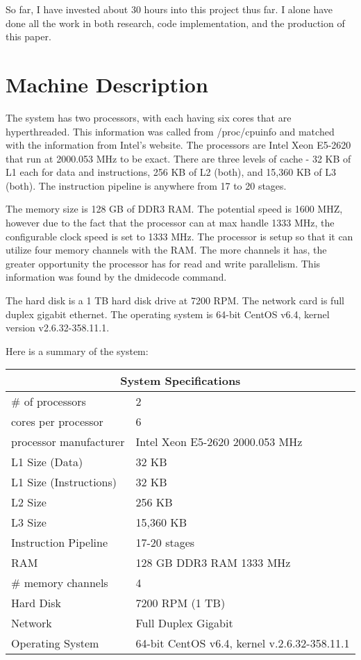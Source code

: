 \documentclass[paper=a4, fontsize=11pt]{scrartcl}
\numberwithin{equation}{section}        %
\numberwithin{figure}{section}          %
\numberwithin{table}{section}               %
\begin{document}
So far, I have invested about 30 hours into this project thus far.  I alone have done all the work in both research, code implementation, and the production of this paper.

\section{Machine Description}

The system has two processors, with each having six cores that are hyperthreaded.  This information was called from /proc/cpuinfo and matched with the information from Intel's website.  The processors are Intel Xeon E5-2620 that run at 2000.053 MHz to be exact.  There are three levels of cache - 32 KB of L1 each for data and instructions, 256 KB of L2 (both), and 15,360 KB of L3 (both).  The instruction pipeline is anywhere from 17 to 20 stages.

The memory size is 128 GB of DDR3 RAM.  The potential speed is 1600 MHZ, however due to the fact that the processor can at max handle 1333 MHz, the configurable clock speed is set to 1333 MHz.  The processor is setup so that it can utilize four memory channels with the RAM.  The more channels it has, the greater opportunity the processor has for read and write parallelism.  This information was found by the dmidecode command.

The hard disk is a 1 TB hard disk drive at 7200 RPM.  The network card is full duplex gigabit ethernet.  The operating system is 64-bit CentOS v6.4, kernel version v2.6.32-358.11.1.

Here is a summary of the system:

\begin{center}
\begin{tabular}{ |l|l| }
  \hline
  \multicolumn{2}{|c|}{System Specifications} \\
  \hline
  \# of processors & 2 \\
  cores per processor & 6 \\
  processor manufacturer & Intel Xeon E5-2620 \@ 2000.053 MHz \\
  L1 Size (Data) & 32 KB \\
  L1 Size (Instructions) & 32 KB \\
  L2 Size & 256 KB \\
  L3 Size & 15,360 KB \\
  Instruction Pipeline & 17-20 stages \\
  RAM & 128 GB DDR3 RAM \@ 1333 MHz \\
  \# memory channels & 4 \\
  Hard Disk & 7200 RPM (1 TB) \\
  Network & Full Duplex Gigabit \\
  Operating System & 64-bit CentOS v6.4, kernel v.2.6.32-358.11.1 \\
  \hline
\end{tabular}
\end{center}
\end{document}
